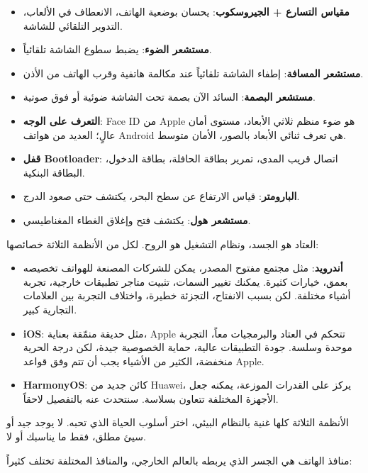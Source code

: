 \begin{itemize}
  \item \textbf{مقياس التسارع + الجيروسكوب}: يحسان بوضعية الهاتف، الانعطاف في الألعاب، التدوير التلقائي للشاشة.
  \item \textbf{مستشعر الضوء}: يضبط سطوع الشاشة تلقائياً.
  \item \textbf{مستشعر المسافة}: إطفاء الشاشة تلقائياً عند مكالمة هاتفية وقرب الهاتف من الأذن.
  \item \textbf{مستشعر البصمة}: السائد الآن بصمة تحت الشاشة ضوئية أو فوق صوتية.
  \item \textbf{التعرف على الوجه}: Face ID من Apple هو ضوء منظم ثلاثي الأبعاد، مستوى أمان عالٍ؛ العديد من هواتف Android هي تعرف ثنائي الأبعاد بالصور، الأمان متوسط.
  \item \textbf{قفل Bootloader}: اتصال قريب المدى، تمرير بطاقة الحافلة، بطاقة الدخول، البطاقة البنكية.
  \item \textbf{البارومتر}: قياس الارتفاع عن سطح البحر، يكتشف حتى صعود الدرج.
  \item \textbf{مستشعر هول}: يكتشف فتح وإغلاق الغطاء المغناطيسي.
\end{itemize}


العتاد هو الجسد، ونظام التشغيل هو الروح. لكل من الأنظمة الثلاثة خصائصها:

\begin{itemize}
  \item \textbf{أندرويد}: مثل مجتمع مفتوح المصدر، يمكن للشركات المصنعة للهواتف تخصيصه بعمق، خيارات كثيرة. يمكنك تغيير السمات، تثبيت متاجر تطبيقات خارجية، تجربة أشياء مختلفة. لكن بسبب الانفتاح، التجزئة خطيرة، واختلاف التجربة بين العلامات التجارية كبير.
  \item \textbf{iOS}: مثل حديقة منمّقة بعناية، Apple تتحكم في العتاد والبرمجيات معاً، التجربة موحدة وسلسة. جودة التطبيقات عالية، حماية الخصوصية جيدة، لكن درجة الحرية منخفضة، الكثير من الأشياء يجب أن تتم وفق قواعد Apple.
  \item \textbf{HarmonyOS}: كائن جديد من Huawei، يركز على القدرات الموزعة، يمكنه جعل الأجهزة المختلفة تتعاون بسلاسة. سنتحدث عنه بالتفصيل لاحقاً.
\end{itemize}

الأنظمة الثلاثة كلها غنية بالنظام البيئي، اختر أسلوب الحياة الذي تحبه. لا يوجد جيد أو سيئ مطلق، فقط ما يناسبك أو لا.


منافذ الهاتف هي الجسر الذي يربطه بالعالم الخارجي، والمنافذ المختلفة تختلف كثيراً:

